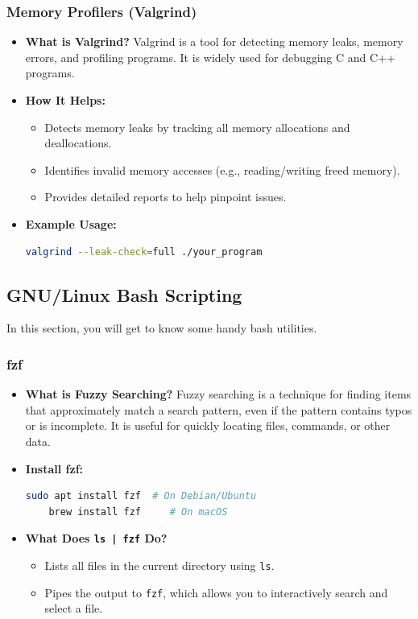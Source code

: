\documentclass{article}
\begin{document}
\subsubsection{Memory Profilers (Valgrind)}
\begin{itemize}
    \item \textbf{What is Valgrind?}
    Valgrind is a tool for detecting memory leaks, memory errors, and profiling programs. It is widely used for debugging C and C++ programs.
    \item \textbf{How It Helps:}
    \begin{itemize}
        \item Detects memory leaks by tracking all memory allocations and deallocations.
        \item Identifies invalid memory accesses (e.g., reading/writing freed memory).
        \item Provides detailed reports to help pinpoint issues.
    \end{itemize}
    \item \textbf{Example Usage:}
    \begin{lstlisting}[language=bash]
    valgrind --leak-check=full ./your_program
    \end{lstlisting}
\end{itemize}

\subsection{GNU/Linux Bash Scripting}
In this section, you will get to know some handy bash utilities.

\subsubsection{fzf}
\begin{itemize}
    \item \textbf{What is Fuzzy Searching?}
    Fuzzy searching is a technique for finding items that approximately match a search pattern, even if the pattern contains typos or is incomplete. It is useful for quickly locating files, commands, or other data.
    \item \textbf{Install fzf:}
    \begin{lstlisting}[language=bash]
    sudo apt install fzf  # On Debian/Ubuntu
    brew install fzf     # On macOS
    \end{lstlisting}
    \item \textbf{What Does \texttt{ls | fzf} Do?}
    \begin{itemize}
        \item Lists all files in the current directory using \texttt{ls}.
        \item Pipes the output to \texttt{fzf}, which allows you to interactively search and select a file.
    \end{itemize}
\end{itemize}
\end{document}
